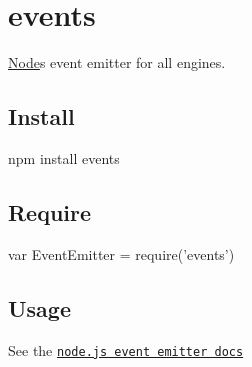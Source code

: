 \section*{events \href{https://travis-ci.org/Gozala/events}{\tt }}

\mbox{\hyperlink{classNode}{Node}}\textquotesingle{}s event emitter for all engines.

\subsection*{Install}


\begin{DoxyCode}
npm install events
\end{DoxyCode}


\subsection*{Require}


\begin{DoxyCode}
var EventEmitter = require('events')
\end{DoxyCode}


\subsection*{Usage}

See the \href{http://nodejs.org/api/events.html}{\tt node.\+js event emitter docs} 